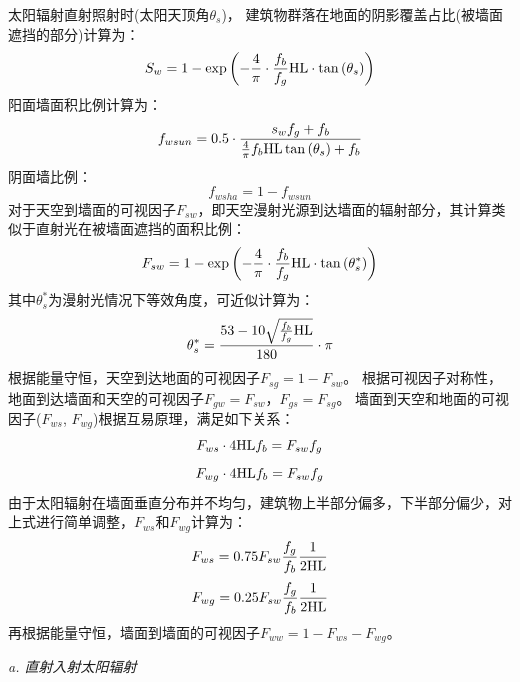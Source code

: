 太阳辐射直射照射时(太阳天顶角$\theta_s$)，
建筑物群落在地面的阴影覆盖占比(被墙面遮挡的部分)计算为：
\begin{equation}\label{S_w}
S_{w}=1-\exp \left(-\frac{4}{\pi} \cdot \frac{f_{b}}{f_{g}} {\rm HL} \cdot \tan \left(\theta_{s}\right)\right)
\end{equation}
阳面墙面积比例计算为：
\begin{equation}\label{f_wsun}
f_{wsun}=0.5 \cdot \frac{s_{w} f_{g}+f_{b}}{\frac{4}{\pi} f_{b} {\rm HL} \tan \left(\theta_{s}\right)+f_{b}}
\end{equation}
阴面墙比例：
\begin{equation}\label{f_wsha}
f_{wsha}=1-f_{wsun}
\end{equation}
对于天空到墙面的可视因子$F_{sw}$，即天空漫射光源到达墙面的辐射部分，其计算类似于直射光在被墙面遮挡的面积比例：
\begin{equation}\label{f_sw}
F_{sw}=1-\exp \left(-\frac{4}{\pi} \cdot \frac{f_{b}}{f_{g}} {\rm HL} \cdot \tan \left(\theta_{s}^{*}\right)\right)
\end{equation}
其中$\theta_s^\ast$为漫射光情况下等效角度，可近似计算为：
\begin{equation}
\theta_{s}^{*}=\frac{53-10 \sqrt{\frac{f_{b}}{f_{g}} {\rm HL}}}{180} \cdot \pi
\end{equation}
根据能量守恒，天空到达地面的可视因子$F_{sg}=1-F_{sw}$。
根据可视因子对称性，地面到达墙面和天空的可视因子$F_{gw}=F_{sw}$，$F_{gs}=F_{sg}$。
墙面到天空和地面的可视因子($F_{ws}$, $F_{wg}$)根据互易原理，满足如下关系：
\begin{equation}
F_{ws} \cdot 4 {\rm HL} f_{b}=F_{s w} f_{g}
\end{equation}
\begin{equation}
F_{wg} \cdot 4 {\rm HL} f_{b}=F_{s w} f_{g}
\end{equation}
由于太阳辐射在墙面垂直分布并不均匀，建筑物上半部分偏多，下半部分偏少，对上式进行简单调整，$F_{ws}$和$F_{wg}$计算为：
\begin{equation}
F_{ws}=0.75 F_{s w} \frac{f_{g}}{f_{b}} \frac{1}{2 {\rm HL}}
\end{equation}
\begin{equation}
F_{wg}=0.25 F_{s w} \frac{f_{g}}{f_{b}} \frac{1}{2 {\rm HL}}
\end{equation}
再根据能量守恒，墙面到墙面的可视因子$F_{ww}=1-F_{ws}-F_{wg}$。

\textit{a. 直射入射太阳辐射}

